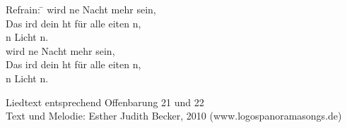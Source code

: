 \begin{tabbing}
Refrain: \=  wird ne Nacht mehr sein,\\ 
         \>  Das  ird dein ht für alle eiten n, \\
\> n Licht n.\\ 
\>  wird ne Nacht mehr sein,\\ 
 \>           Das  ird dein ht für alle eiten n, \\
\> n Licht n. 
\end{tabbing}

\begin{footnotesize}
Liedtext entsprechend Offenbarung 21 und 22\\
Text und Melodie: Esther Judith Becker, 2010 (www.logospanoramasongs.de)
\end{footnotesize}
